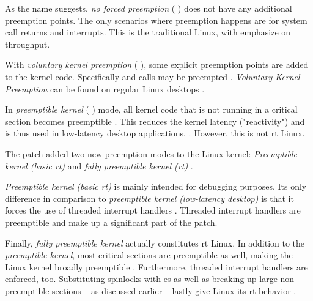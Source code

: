 \documentclass[10pt,twocolumn,a4paper]{article}
\begin{document}
As the name suggests, \emph{no forced preemption} ( \cite{mckenney_realtime_2005}) does not have any additional preemption points.
The only scenarios where preemption happens are for system call returns and interrupts.
This is the traditional Linux, with emphasize on throughput.

With \emph{voluntary kernel preemption} ( \cite{mckenney_realtime_2005}), some explicit preemption points are added to the kernel code.
Specifically  and  calls may be preempted \cite{day_re_2007}.
\emph{Voluntary Kernel Preemption} can be found on regular Linux desktops \cite{mckenney_realtime_2005}.

In \emph{preemptible kernel} ( \cite{mckenney_realtime_2005}) mode, all kernel code that is not running in a critical section becomes preemptible \cite{lf:preemption}.
This reduces the kernel latency ("reactivity") and is thus used in low-latency desktop applications. \cite{mckenney_realtime_2005}.
However, this is not \acrshort{rt} Linux.
\newline

\noindent The  patch added two new preemption modes to the Linux kernel:
\emph{Preemptible kernel (basic \acrshort{rt})} and \emph{fully preemptible kernel (\acrshort{rt})} \cite{lf:preemption}.

\emph{Preemptible kernel (basic \acrshort{rt})} is mainly intended for debugging purposes.
Its only difference in comparison to \emph{preemptible kernel (low-latency desktop)} is that it forces the use of threaded interrupt handlers \cite{lf:preemption}.
Threaded interrupt handlers are preemptible and make up a significant part of the  patch.

Finally, \emph{fully preemptible kernel} actually constitutes \acrshort{rt} Linux.
In addition to the \emph{preemptible kernel}, most critical sections are preemptible as well, making the Linux kernel broadly preemptible \cite{lf:preemption}.
Furthermore, threaded interrupt handlers are enforced, too.
Substituting spinlocks with es as well as breaking up large non-preemptible sections -- as discussed earlier -- lastly give Linux its \acrshort{rt} behavior \cite{lf:preemption}.
\end{document}
